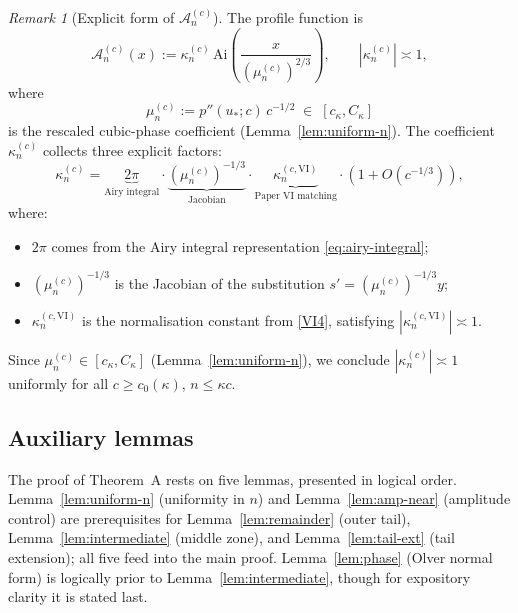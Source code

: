 \documentclass[12pt,a4paper]{amsart}
\theoremstyle{definition}
\theoremstyle{remark}
\newtheorem{remark}[theorem]{Remark}
\newcommand{\Ai}{\mathrm{Ai}}
\newcommand{\ustar}{u_*}
\begin{document}
\begin{remark}[Explicit form of $\mathcal{A}_n^{(c)}$]
\label{rem:A-explicit}
The profile function is
\begin{equation}
\label{eq:A-explicit}
\mathcal{A}_n^{(c)}(x)
:= \kappa_n^{(c)}\,
\Ai\!\left(\frac{x}{(\mu_n^{(c)})^{2/3}}\right),
\qquad |\kappa_n^{(c)}| \asymp 1,
\end{equation}
where
\begin{equation}
\label{eq:mu-def}
\mu_n^{(c)} := p''(\ustar;c)\,c^{-1/2}
\;\in\; [c_\kappa, C_\kappa]
\end{equation}
is the rescaled cubic-phase coefficient
(Lemma~\ref{lem:uniform-n}).
The coefficient $\kappa_n^{(c)}$ collects
three explicit factors:
\begin{equation}
\label{eq:kappa-explicit}
\kappa_n^{(c)}
= \underbrace{2\pi}_{\text{Airy integral}}
  \cdot
  \underbrace{(\mu_n^{(c)})^{-1/3}}_{\text{Jacobian}}
  \cdot
  \underbrace{\kappa_n^{(c,\mathrm{VI})}}_{\text{Paper~VI matching}}
  \cdot (1 + O(c^{-1/3})),
\end{equation}
where:
\begin{itemize}
\item $2\pi$ comes from the Airy integral
  representation \eqref{eq:airy-integral};
\item $(\mu_n^{(c)})^{-1/3}$ is the Jacobian
  of the substitution $s' = (\mu_n^{(c)})^{-1/3}y$;
\item $\kappa_n^{(c,\mathrm{VI})}$ is the
  normalisation constant from \eqref{VI4},
  satisfying $|\kappa_n^{(c,\mathrm{VI})}| \asymp 1$.
\end{itemize}
Since $\mu_n^{(c)} \in [c_\kappa, C_\kappa]$
(Lemma~\ref{lem:uniform-n}), we conclude
$|\kappa_n^{(c)}| \asymp 1$
uniformly for all $c \ge c_0(\kappa)$,
$n \le \kappa c$.
\end{remark}

\subsection{Auxiliary lemmas}

The proof of Theorem~A rests on five lemmas,
presented in logical order.
Lemma~\ref{lem:uniform-n} (uniformity in $n$)
and Lemma~\ref{lem:amp-near} (amplitude control)
are prerequisites for
Lemma~\ref{lem:remainder} (outer tail),
Lemma~\ref{lem:intermediate} (middle zone),
and Lemma~\ref{lem:tail-ext} (tail extension);
all five feed into the main proof.
Lemma~\ref{lem:phase} (Olver normal form) is
logically prior to Lemma~\ref{lem:intermediate},
though for expository clarity it is stated last.
\end{document}

